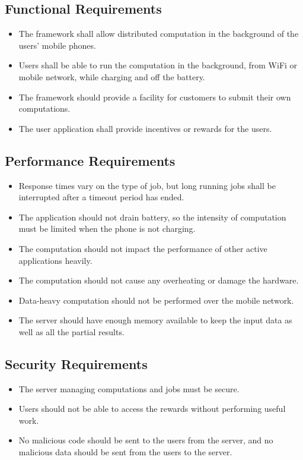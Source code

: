 \documentclass[a4paper,10pt]{article}
\begin{document}
\subsection{Functional Requirements}

\begin{itemize}
	\item The framework shall allow distributed computation in the background of the users’ mobile phones.
	\item Users shall be able to run the computation in the background, from WiFi or mobile network, while charging and off the battery.
	\item The framework should provide a facility for customers to submit their own computations.
	\item The user application shall provide incentives or rewards for the users.
\end{itemize} 

\subsection{Performance Requirements}

\begin{itemize}
	\item Response times vary on the type of job, but long running jobs shall be interrupted after a timeout period has ended.
	\item The application should not drain battery, so the intensity of computation must be limited when the phone is not charging.
	\item The computation should not impact the performance of other active applications heavily.
	\item The computation should not cause any overheating or damage the hardware.
	\item Data-heavy computation should not be performed over the mobile network.
	\item The server should have enough memory available to keep the input data as well as all the partial results.
\end{itemize} 

\subsection{Security Requirements}

\begin{itemize}
	\item The server managing computations and jobs must be secure.
	\item Users should not be able to access the rewards without performing useful work.
	\item No malicious code should be sent to the users from the server, and no malicious data should be sent from the users to the server.
\end{itemize} 
\end{document}
